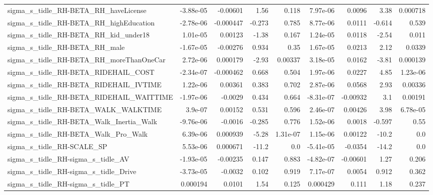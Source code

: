 \begin{tabular}{lrrrrrrrr}
sigma\_s\_tidle\_RH-BETA\_RH\_haveLicense               &   -3.88e-05 &     -0.00601 &     1.56 &    0.118 &   7.97e-06 &      0.0096 &         3.38 &      0.000718 \\
sigma\_s\_tidle\_RH-BETA\_RH\_highEducation             &   -2.78e-06 &    -0.000447 &   -0.273 &    0.785 &   8.77e-06 &      0.0111 &       -0.614 &         0.539 \\
sigma\_s\_tidle\_RH-BETA\_RH\_kid\_under18               &    1.01e-05 &      0.00123 &    -1.38 &    0.167 &   1.24e-05 &      0.0118 &        -2.54 &         0.011 \\
sigma\_s\_tidle\_RH-BETA\_RH\_male                      &   -1.67e-05 &     -0.00276 &    0.934 &     0.35 &   1.67e-05 &      0.0213 &         2.12 &        0.0339 \\
sigma\_s\_tidle\_RH-BETA\_RH\_moreThanOneCar            &    2.72e-06 &     0.000179 &    -2.93 &  0.00337 &   3.18e-05 &      0.0162 &        -3.81 &      0.000139 \\
sigma\_s\_tidle\_RH-BETA\_RIDEHAIL\_COST                &   -2.34e-07 &    -0.000462 &    0.668 &    0.504 &   1.97e-06 &      0.0227 &         4.85 &      1.23e-06 \\
sigma\_s\_tidle\_RH-BETA\_RIDEHAIL\_IVTIME              &    1.22e-06 &      0.00361 &    0.383 &    0.702 &   2.87e-06 &      0.0568 &         2.93 &       0.00336 \\
sigma\_s\_tidle\_RH-BETA\_RIDEHAIL\_WAITTIME            &   -1.97e-06 &      -0.0029 &    0.434 &    0.664 &  -8.31e-07 &    -0.00932 &          3.1 &       0.00191 \\
sigma\_s\_tidle\_RH-BETA\_WALK\_WALKTIME                &     3.9e-07 &      0.00152 &    0.531 &    0.596 &   2.46e-07 &     0.00426 &         3.98 &      6.78e-05 \\
sigma\_s\_tidle\_RH-BETA\_Walk\_Inertia\_Walk            &   -9.76e-06 &      -0.0016 &   -0.285 &    0.776 &   1.52e-06 &      0.0018 &       -0.597 &          0.55 \\
sigma\_s\_tidle\_RH-BETA\_Walk\_Pro\_Walk                &    6.39e-06 &     0.000939 &    -5.28 & 1.31e-07 &   1.15e-06 &     0.00122 &        -10.2 &           0.0 \\
sigma\_s\_tidle\_RH-SCALE\_SP                          &    5.53e-06 &     0.000671 &    -11.2 &      0.0 &  -5.41e-05 &     -0.0354 &        -14.2 &           0.0 \\
sigma\_s\_tidle\_RH-sigma\_s\_tidle\_AV                  &   -1.93e-05 &     -0.00235 &    0.147 &    0.883 &  -4.82e-07 &    -0.00601 &         1.27 &         0.206 \\
sigma\_s\_tidle\_RH-sigma\_s\_tidle\_Drive               &   -3.73e-05 &      -0.0032 &    0.102 &    0.919 &   7.17e-07 &      0.0054 &        0.912 &         0.362 \\
sigma\_s\_tidle\_RH-sigma\_s\_tidle\_PT                  &    0.000194 &       0.0101 &     1.54 &    0.125 &   0.000429 &       0.111 &         1.18 &         0.237 \\
\bottomrule
\end{tabular}
